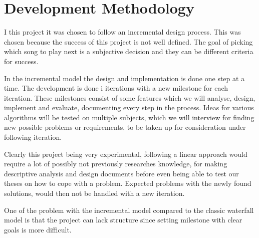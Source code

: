 \chapter{Development Methodology}

I this project it was chosen to follow an incremental design process. This was chosen because the success of this project is not well defined. The goal of picking which song to play next is a subjective decision and they can be different criteria for success.

In the incremental model the design and implementation is done one step at a time. The development is done i iterations with a new milestone for each iteration. These milestones consist of some features which we will analyse, design, implement and evaluate, documenting every step in the process. Ideas for various algorithms will be tested on multiple subjects, which we will interview for finding new possible problems or requirements, to be taken up for consideration under following iteration.

Clearly this project being very experimental, following a linear approach would require a lot of possibly not previously researches knowledge, for making descriptive analysis and design documents before even being able to test our theses on how to cope with a problem. Expected problems with the newly found solutions, would then not be handled with a new iteration.

One of the problem with the incremental model compared to the classic waterfall model is that the project can lack structure since setting milestone with clear goals is more difficult.


